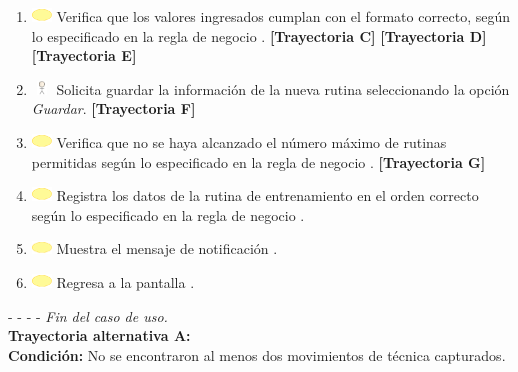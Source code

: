 \begin{enumerate}
	\item \includegraphics[width=15pt]{./Figuras/iconosCU/herramienta.png} Verifica que los valores ingresados cumplan con el formato correcto, según lo especificado en la regla de negocio . \textbf{[Trayectoria C]} \textbf{[Trayectoria D]} \textbf{[Trayectoria E]} 
	\item \includegraphics[width=15pt, height=10pt]{./Figuras/iconosCU/usuario.png} Solicita guardar la información de la nueva rutina seleccionando la opción \textit{Guardar}. \textbf{[Trayectoria F]}
	\item \includegraphics[width=15pt]{./Figuras/iconosCU/herramienta.png} Verifica que no se haya alcanzado el número máximo de rutinas permitidas según lo especificado en la regla de negocio . \textbf{[Trayectoria G]}
	\item \includegraphics[width=15pt]{./Figuras/iconosCU/herramienta.png} Registra los datos de la rutina de entrenamiento en el orden correcto según lo especificado en la regla de negocio .
	\item \includegraphics[width=15pt]{./Figuras/iconosCU/herramienta.png} Muestra el mensaje de notificación .
	\item \includegraphics[width=15pt]{./Figuras/iconosCU/herramienta.png} Regresa a la pantalla .
\end{enumerate}
	
- - - - \textit{Fin del caso de uso.} \\

\textbf{\large{Trayectoria alternativa A:}}\\
\textbf{Condición: } No se encontraron al menos dos movimientos de técnica capturados.

